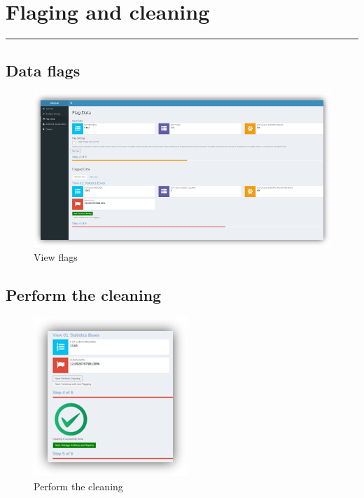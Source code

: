 \documentclass[]{book}
\begin{document}
\chapter{Flaging and cleaning}\label{flaging-and-cleaning}

\begin{center}\rule{0.5\linewidth}{\linethickness}\end{center}

\section{Data flags}\label{data-flags}

\begin{figure}
\centering
\includegraphics{img/bdclean_flag.png}
\caption{View flags}
\end{figure}

\section{Perform the cleaning}\label{perform-the-cleaning}

\begin{figure}
\centering
\includegraphics{img/bdclean_clean.png}
\caption{Perform the cleaning}
\end{figure}
\end{document}
